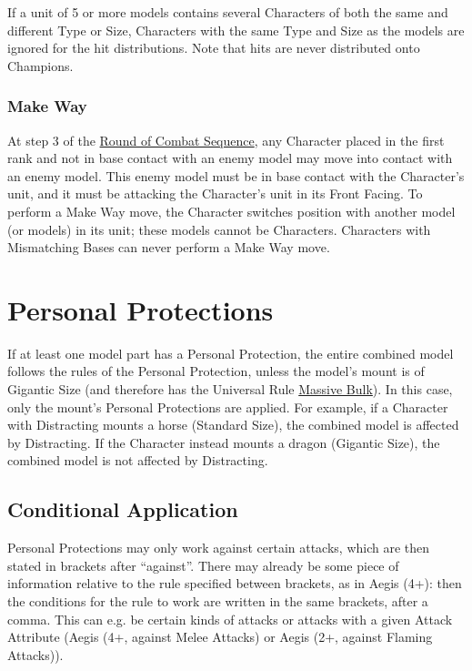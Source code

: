   \vspace*{5pt}
If a unit of 5 or more \rnf{} models contains several Characters of both the same and different Type or Size, Characters with the same Type and Size as the \rnf{} models are ignored for the hit distributions. Note that hits are never distributed onto Champions.

\subsubsection{Make Way}
\label{make_way}

At step 3 of the \hyperref[round_of_combat_sequence]{Round of Combat Sequence}, any Character placed in the first rank and not in base contact with an enemy model may move into contact with an enemy model. This enemy model must be in base contact with the Character's unit, and it must be attacking the Character's unit in its Front Facing. To perform a Make Way move, the Character switches position with another model (or models) in its unit; these models cannot be Characters. Characters with Mismatching Bases can never perform a Make Way move.

\section{Personal Protections}
\label{personal_protections}

If at least one model part has a Personal Protection, the entire combined model follows the rules of the Personal Protection, unless the model's mount is of Gigantic Size (and therefore has the Universal Rule \hyperref[massive_bulk]{Massive Bulk}). In this case, only the mount's Personal Protections are applied. For example, if a Character with Distracting mounts a horse (Standard Size), the combined model is affected by Distracting. If the Character instead mounts a dragon (Gigantic Size), the combined model is not affected by Distracting.

\subsection{Conditional Application}
\label{PP_conditional_application}

Personal Protections may only work against certain attacks, which are then stated in brackets after \enquote{against}. There may already be some piece of information relative to the rule specified between brackets, as in Aegis (4+): then the conditions for the rule to work are written in the same brackets, after a comma. This can e.g. be certain kinds of attacks or attacks with a given Attack Attribute (Aegis (4+, against Melee Attacks) or Aegis (2+, against Flaming Attacks)).

